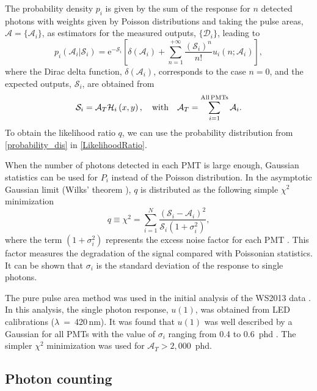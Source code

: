 \documentclass[a4paper,11pt]{article}
\begin{document}
 The probability density $p_i$ is given by the sum of the response for $n$ detected photons with weights given by Poisson  distributions and taking the pulse areas, $\mathcal{A}=\{\mathcal{A}_i\}$, as estimators for the measured outputs, $\{\mathcal{D}_i\}$, leading to
\begin{equation}
p_i\left(\mathcal{A}_i| \mathcal{S}_i \right) = \mathrm{e}^{-\mathcal{S}_i}\left[\delta\left(\mathcal{A}_i\right) + \sum_{n=1}^{+\infty} \frac{\left(\mathcal{S}_i\right)^n}{n!} u_i\left(n; \mathcal{A}_i\right) \right],
 \label{probability_dis}
\end{equation}
where the Dirac delta function, $\delta\left(\mathcal{A}_i\right)$, corresponds to the case $n=0$, and the expected outputs, $\mathcal{S}_i$, are obtained from
\begin{equation}
\mathcal{S}_i = {\mathcal A}_T {\mathcal H}_i \left(x, y\right),\quad {\rm with} \quad {\mathcal A}_T = \sum_{i=1}^{\mathrm{All\,PMTs}} \mathcal{A}_i.
\end{equation}
To obtain the likelihood ratio $q$, we can use the probability distribution from \cref{probability_dis} in \cref{LikelihoodRatio}.

When the number of photons detected in each PMT is large enough, Gaussian statistics can be used for $P_i$ instead of the Poisson distribution. In the asymptotic Gaussian limit (Wilks' theorem \cite{Wilks1938_LikelihoodRatio}), $q$ is distributed as the following simple $\chi^2$ minimization 
\begin{equation}
q\equiv \chi^2 = \sum_{i=1}^N\frac{\left({\mathcal S}_i-\mathcal{A}_i\right)^2} {\mathcal{S}_i\left(1+\sigma_i^2\right)},
 \label{chi2_method}
\end{equation}
where the term $\left(1+\sigma_i^2\right)$ represents the excess noise factor for each PMT \cite{5402300}. This factor measures the degradation of the signal compared with Poissonian statistics. It can be shown that $\sigma_i$ is the standard deviation of the response to single  photons. 

The pure pulse area method was used in the initial analysis of the WS2013 data \cite{LUX2014_OriginalResults}. In this analysis, the single photon response, $u(1)$, was obtained from LED calibrations ($\lambda$~=~420\,nm). It was found that $u(1)$ was well described by a Gaussian  for all PMTs with the value of $\sigma_i$ ranging from 0.4 to 0.6~phd \cite{LUXCF_thesis}. The simpler $\chi^2$ minimization was used for  ${\mathcal A}_T>2,000$~phd. 

\subsection{Photon counting}
\end{document}
